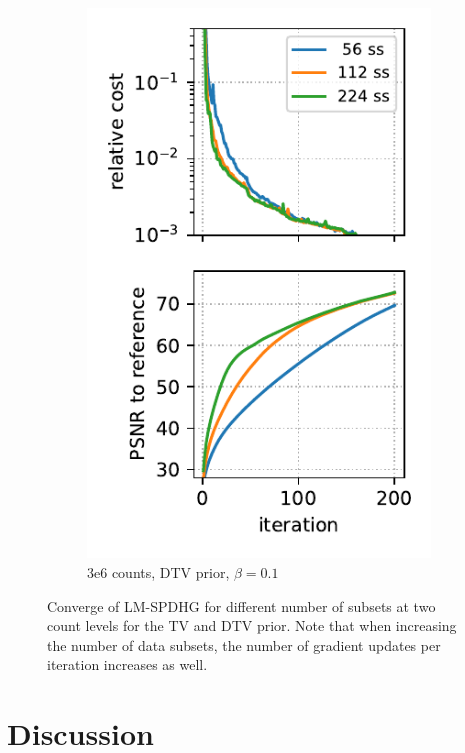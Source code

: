 \begin{figure}
\begin{subfigure}[b]{0.23\textwidth}
    \includegraphics[width=1.0\textwidth]{./figs/brain2d_counts_3.0E+06_seed_1_beta_1.0E-01_prior_DTV_niter_ref_20000_fwhm_4.5_4.5_niter_200_ss.pdf}
    \caption{3e6 counts, DTV prior, $\beta = 0.1$}
  \end{subfigure}

  \caption{Converge of LM-SPDHG for different number of subsets at two count levels for the TV and 
           DTV prior. Note that when increasing the number of data subsets, the number of gradient
           updates per iteration increases as well.}
  \label{fig:num_subsets}
\end{figure}


\section{Discussion}

